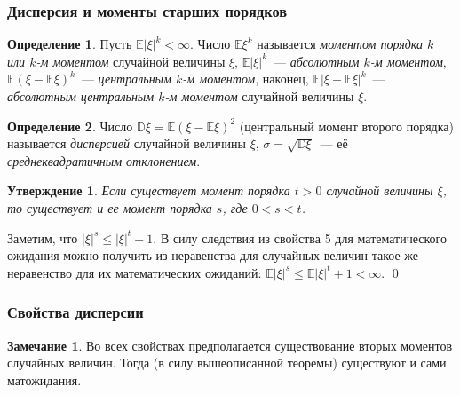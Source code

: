 \documentclass[oneside,final,14pt]{extreport}
\renewenvironment{proof}{{\bfseries Доказательство.}}{\qed}
\theoremstyle{plain}
\newtheorem*{thm*}{Утверждение}
\theoremstyle{definition}
\newtheorem*{defn}{Определение}
\newtheorem*{rmrk}{Замечание}
\theoremstyle{named}
\begin{document}
\subsubsection{Дисперсия и моменты старших порядков}

\begin{defn}
    Пусть ${\mathbb{E}|\xi|^k < \infty}$. Число ${\mathbb{E}\xi^k}$ называется {\it моментом порядка $k$ или $k$-м моментом} случайной величины $\xi$, ${\mathbb{E}|\xi|^k}$~--- {\it абсолютным $k$-м моментом}, ${\mathbb{E}(\xi - \mathbb{E}\xi)^k}$~--- {\it центральным $k$-м моментом}, наконец, ${\mathbb{E}|\xi - \mathbb{E}\xi|^k}$~--- {\it абсолютным центральным $k$-м моментом} случайной величины $\xi$.
\end{defn}

\begin{defn}
    Число $\mathbb{D}\xi = \mathbb{E}(\xi - \mathbb{E}\xi)^2$ (центральный момент второго порядка) называется {\it дисперсией} случайной величины $\xi$, $\sigma = \sqrt{\mathbb{D}\xi}$~--- её {\it среднеквадратичным отклонением}.
\end{defn} 

\begin{thm*}
    Если существует момент порядка $t > 0$ случайной величины $\xi$, то существует и ее момент порядка $s$, где $0 < s < t$.
\end{thm*}

\begin{proof} 
Заметим, что $|\xi|^s \leqslant |\xi|^t + 1.$ В силу следствия из свойства 5 для математического ожидания можно получить из неравенства для случайных величин такое же неравенство для их математических ожиданий: $\mathbb{E}|\xi|^s \leqslant \mathbb{E}|\xi|^t + 1 < \infty.$
\end{proof}

\subsubsection{Свойства дисперсии}

\begin{rmrk}
        Во всех свойствах предполагается существование вторых моментов случайных величин. Тогда (в силу вышеописанной теоремы) существуют и сами матожидания.
\end{rmrk} 
\end{document}
